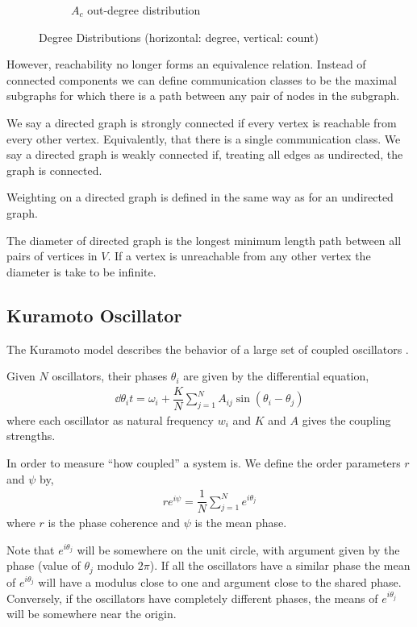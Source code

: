 \documentclass[10pt]{article}
\begin{document}
\begin{figure}[b]
\begin{subfigure}{.3\textwidth}
    \caption{\(A_c\) out-degree distribution}
\end{subfigure}
\caption{Degree Distributions (horizontal: degree, vertical: count)}
\label{degrees}
\end{figure}

However, reachability no longer forms an equivalence relation. Instead of connected components we can define communication classes to be the maximal subgraphs for which there is a path between any pair of nodes in the subgraph.

We say a directed graph is strongly connected if every vertex is reachable from every other vertex. Equivalently, that there is a single communication class. We say a directed graph is weakly connected if, treating all edges as undirected, the graph is connected.

Weighting on a directed graph is defined in the same way as for an undirected graph.

The diameter of directed graph is the longest minimum length path between all pairs of vertices in \( V \). If a vertex is unreachable from any other vertex the diameter is take to be infinite.

\subsection{Kuramoto Oscillator}
The Kuramoto model describes the behavior of a large set of coupled oscillators \cite{lecture_notes}.

Given \( N \) oscillators, their phases \( \theta_i \) are given by the differential equation,
\begin{align}
    \dd{\theta_i}{t} = \omega_i + \dfrac{K}{N} \sum_{j=1}^{N} A_{ij}\sin(\theta_i-\theta_j) \label{kuramoto}
\end{align}
where each oscillator as natural frequency \( w_i \) and \( K \) and \( A \) gives the coupling strengths.

In order to measure ``how coupled'' a system is. We define the order parameters \( r \) and \( \psi \) by,
\begin{align}
    re^{i\psi} = \dfrac{1}{N} \sum_{j=1}^{N} e^{i\theta_j} \label{coherence}
\end{align}
where \( r \) is the phase coherence and \( \psi \) is the mean phase.

Note that \( e^{i\theta_j} \) will be somewhere on the unit circle, with argument given by the phase (value of \( \theta_j \) modulo \( 2\pi \)). If all the oscillators have a similar phase the mean of \( e^{i\theta_j} \) will have a modulus close to one and argument close to the shared phase. Conversely, if the oscillators have completely different phases, the means of \( e^{i\theta_j} \) will be somewhere near the origin.
\end{document}
